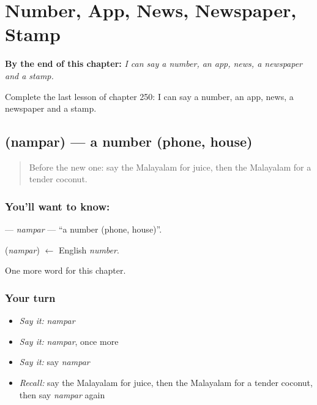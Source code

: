 
\chapter{Number, App, News, Newspaper, Stamp}
\label{ch:ml-number-app-news-newspaper-stamp}

\begin{chapteropening}
\textbf{By the end of this chapter:} \emph{I can say a number, an app, news, a newspaper and a stamp.}

Complete the last lesson of chapter 250: I can say a number, an app, news, a newspaper and a stamp.
\end{chapteropening}

\section[\texorpdfstring{\ml{നമ്പർ} (nampar)}{നമ്പർ (nampar)}]{ (nampar) — a number (phone, house)}

\label{lesson:ML-C250-nampar}



\begin{quote}
Before the new one: say the Malayalam for juice, then the Malayalam for a tender coconut.
\end{quote}

\subsection*{You'll want to know: }
\textbf{} — \emph{nampar} — \textquotedblleft{}a number (phone, house)\textquotedblright{}.

\begin{cousinweb}
\textbf{} (\emph{nampar}) $\leftarrow$ English \emph{number}.
\end{cousinweb}

\begin{grammarlens}[title={What you've built}]
One more word for this chapter.
\end{grammarlens}

\subsection*{Your turn}
\begin{itemize}
\raggedright
  \item \emph{Say it:} \emph{nampar}
  \item \emph{Say it:} \emph{nampar}, once more
  \item \emph{Say it:} say \emph{nampar}
  \item \emph{Recall:} say the Malayalam for juice, then the Malayalam for a tender coconut, then say \emph{nampar} again
\end{itemize}

